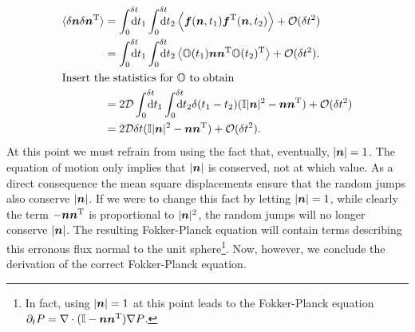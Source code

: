 \documentclass[thesis.tex]{subfiles}
\begin{document}
\begin{align}
	\langle \delta \ve n\delta \ve n\transpose\rangle &= \int_0^{\delta t}\!\!\!\!\!\rd t_1 \int_0^{\delta t}\!\!\!\!\!\rd t_2 \left\langle\ve f(\ve n,t_1) \ve f\transpose(\ve n, t_2)\right\rangle + \mathcal O(\delta t^2)\nn\\
	&= \int_0^{\delta t}\!\!\!\!\!\rd t_1 \int_0^{\delta t}\!\!\!\!\!\rd t_2 \left\langle \ma O(t_1)\ve n\ve n\transpose \ma O(t_2)\transpose \right\rangle + \mathcal O(\delta t^2).\nn\\
	\intertext{Insert the statistics for $\ma O$ to obtain}
	&= 2\mathcal D \int_0^{\delta t}\!\!\!\!\!\rd t_1 \int_0^{\delta t}\!\!\!\!\!\rd t_2 \delta(t_1-t_2)(\ma I|\ve n|^2-\ve n\ve n\transpose) + \mathcal O(\delta t^2)\nn\\
	&= 2\mathcal D \delta t (\ma I|\ve n|^2-\ve n\ve n\transpose) + \mathcal O(\delta t^2).\eqnlab{a2vec}
\end{align}
At this point we must refrain from using the fact that, eventually, $|\mbox{\boldmath$n$}|=1$. The equation of motion  only implies that $|\mbox{\boldmath$n$}|$ is conserved, not at which value. As a direct consequence the mean square displacements  ensure that the random jumps also conserve $|\mbox{\boldmath$n$}|$. If we were to change this fact by letting $|\mbox{\boldmath$n$}|=1$, while clearly the term $-\mbox{\boldmath$n$}\mbox{\boldmath$n$}^{\mathrm T}$ is proportional to  $|\mbox{\boldmath$n$}|^2$, the random jumps will no longer conserve $|\mbox{\boldmath$n$}|$. The resulting Fokker-Planck equation will contain terms describing this erronous flux normal to the unit sphere\footnote{In fact, using $|\mbox{\boldmath$n$}|=1$ at this point leads to the Fokker-Planck equation $\partial_t P = \nabla\cdot(\mathbb{I}-\mbox{\boldmath$n$}\mbox{\boldmath$n$}^{\mathrm T})\nabla P$.}. Now, however, we conclude the derivation of the correct Fokker-Planck equation.
\end{document}
